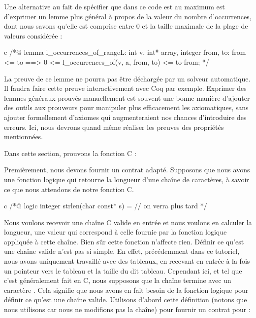Une alternative au fait de spécifier que dans ce code  est au
maximum  est d'exprimer un lemme plus général à propos de la valeur
du nombre d'occurrences, dont nous savons qu'elle est comprise entre 0 et
la taille maximale de la plage de valeurs considérée :



\begin{CodeBlock}{c}
/*@
lemma l_occurrences_of_range{L}:
  \forall int v, int* array, integer from, to:
    from <= to ==> 0 <= l_occurrences_of(v, a, from, to) <= to-from;
*/
\end{CodeBlock}



La preuve de ce lemme ne pourra pas être déchargée par un solveur automatique. Il
faudra faire cette preuve interactivement avec Coq par exemple. Exprimer des
lemmes généraux prouvés manuellement est souvent une bonne manière d'ajouter des
outils aux prouveurs pour manipuler plus efficacement les axiomatiques, sans
ajouter formellement d'axiomes qui augmenteraient nos chances d'introduire des
erreurs. Ici, nous devrons quand même réaliser les preuves des propriétés
mentionnées.




Dans cette section, prouvons la fonction C :




Premièrement, nous devons fournir un contrat adapté. Supposons que nous avons
une fonction logique  qui retourne la longueur d'une chaîne
de caractères, à savoir ce que nous attendons de notre fonction C.


\begin{CodeBlock}{c}
/*@
  logic integer strlen(char const* s) = // on verra plus tard
*/
\end{CodeBlock}


Nous voulons recevoir une chaîne C valide en entrée et nous voulons en
calculer la longueur, une valeur qui correspond à celle fournie par la
fonction logique  appliquée à cette chaîne. Bien sûr
cette fonction n'affecte rien. Définir ce qu'est une chaîne valide n'est
pas si simple. En effet, précédemment dans ce tutoriel, nous avons uniquement
travaillé avec des tableaux, en recevant en entrée à la fois un pointeur
vers le tableau et la taille du dit tableau. Cependant ici, et tel que
c'est généralement fait en C, nous supposons que la chaîne termine avec
un caractère . Cela signifie que nous
avons en fait besoin de la fonction logique  pour
définir ce qu'est une chaîne valide. Utilisons d'abord cette définition
(notons que nous utilisons 
car nous ne modifions pas la chaîne) pour fournir un contrat pour
 :


